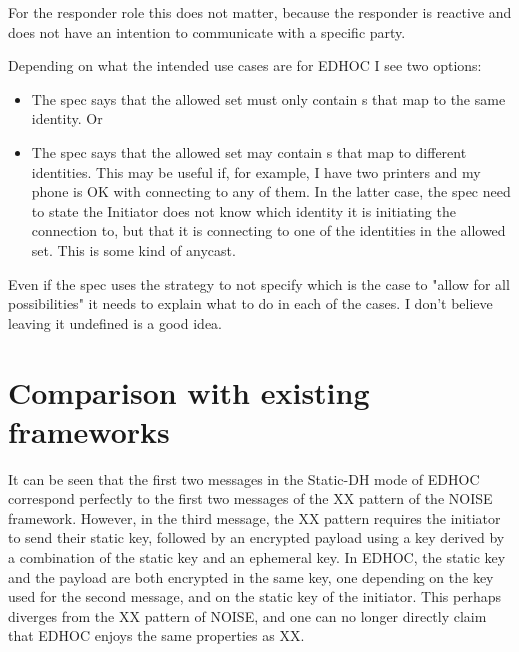 For the responder role this does not matter, because the responder is reactive
and does not have an intention to communicate with a specific party.
%

Depending on what the intended use cases are for EDHOC I see two options:
\begin{itemize}
    \item The spec says that the allowed set must only contain s
            that map to the same identity. Or
    \item The spec says that the allowed set may contain s that map
            to different identities. This may be useful if, for example, I
            have two printers and my phone is OK with connecting to any of
            them. In the latter case, the spec need to state the Initiator
            does not know which identity it is initiating the connection to,
            but that it is connecting to one of the identities in the
            allowed set. This is some kind of anycast.
\end{itemize}
%
Even if the spec uses the strategy to not specify which is the case to
"allow for all possibilities" it needs to explain what to do in each of the
cases.
%
I don't believe leaving it undefined is a good idea.
%

\section{Comparison with existing frameworks}
\label{sec:mail-notes-noise}
It can be seen that the first two messages in the Static-DH mode of EDHOC correspond perfectly to the first two messages of the XX pattern of the NOISE framework. However, in the third message, the XX pattern requires the initiator to send their static key, followed by an encrypted payload using a key derived by a combination of the static key and an ephemeral key. In EDHOC, the static key and the payload are both encrypted in the same key, one depending on the key used for the second message, and on the static key of the initiator. This perhaps diverges from the XX pattern of NOISE, and one can no longer directly claim that EDHOC enjoys the same properties as XX. 
